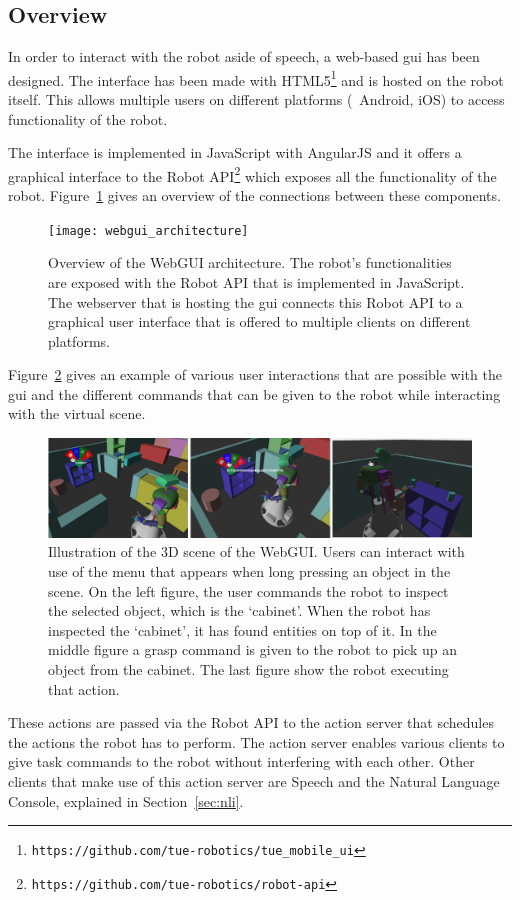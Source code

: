 \subsection*{Overview}

In order to interact with the robot aside of speech, a web-based \gls{gui} has been designed.
The interface has been made with HTML5\footnote{\texttt{https://github.com/tue-robotics/tue\_mobile\_ui}} and is hosted on the robot itself.
This allows multiple users on different platforms (\eg\ Android, iOS) to access functionality of the robot.

The interface is implemented in JavaScript with AngularJS and it offers a graphical interface to the Robot API\footnote{\texttt{https://github.com/tue-robotics/robot-api}} which exposes all the functionality of the robot.
Figure~\ref{fig:webgui_architecture} gives an overview of the connections between these components.

\begin{figure}[H]
	\texttt{[image: webgui\_architecture]}
	\caption{
		Overview of the WebGUI architecture.
		The robot's functionalities are exposed with the Robot API that is implemented in JavaScript.
		The webserver that is hosting the \protect\gls{gui} connects this Robot API to a graphical user interface that is offered to multiple clients on different platforms.}
	\label{fig:webgui_architecture}
\end{figure}

Figure~\ref{fig:gui_actions} gives an example of various user interactions that are possible with the \gls{gui} and the different commands that can be given to the robot while interacting with the virtual scene.

\begin{figure}[H]
	\includegraphics[width=\linewidth]{Figures/gui_actions}
	\caption{
		Illustration of the 3D scene of the WebGUI.
		Users can interact with use of the menu that appears when long pressing an object in the scene.
		On the left figure, the user commands the robot to inspect the selected object, which is the `cabinet'.
		When the robot has inspected the `cabinet', it has found entities on top of it.
		In the middle figure a grasp command is given to the robot to pick up an object from the cabinet.
		The last figure show the robot executing that action.}
	\label{fig:gui_actions}
\end{figure}

These actions are passed via the Robot API to the action server that schedules the actions the robot has to perform.
The action server enables various clients to give task commands to the robot without interfering with each other.
Other clients that make use of this action server are Speech and the Natural Language Console, explained in Section~\ref{sec:nli}.
